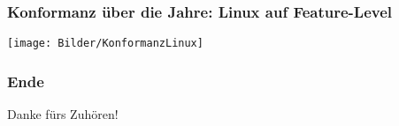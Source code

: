 \documentclass{beamer}
\begin{document}
	\begin{frame}
	\frametitle{Konformanz über die Jahre: Linux auf Feature-Level}
	\centering
	\texttt{[image: Bilder/KonformanzLinux]}
	\end{frame}







	\begin{frame}
	\frametitle{Ende}
	\Huge
	\centering
	Danke fürs Zuhören!
	\end{frame}
\end{document}

